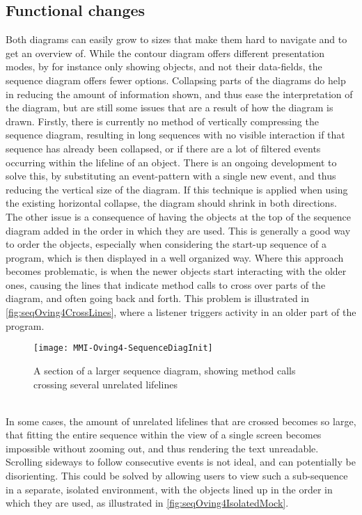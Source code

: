 \subsection{Functional changes}\label{jiveSuggestionsFunctional}
Both diagrams can easily grow to sizes that make them hard to navigate and to get an overview of.
While the contour diagram offers different presentation modes, by for instance only showing objects, and not their data-fields, the sequence diagram offers fewer options.
Collapsing parts of the diagrams do help in reducing the amount of information shown, and thus ease the interpretation of the diagram, but are still some issues that are a result of how the diagram is drawn.
Firstly, there is currently no method of vertically compressing the sequence diagram, resulting in long sequences with no visible interaction if that sequence has already been collapsed, or if there are a lot of filtered events occurring within the lifeline of an object.
There is an ongoing development to solve this, by substituting an event-pattern with a single new event, and thus reducing the vertical size of the diagram.
If this technique is applied when using the existing horizontal collapse, the diagram should shrink in both directions.
~\\

The other issue is a consequence of having the objects at the top of the sequence diagram added in the order in which they are used.
This is generally a good way to order the objects, especially when considering the start-up sequence of a program, which is then displayed in a well organized way.
Where this approach becomes problematic, is when the newer objects start interacting with the older ones, causing the lines that indicate method calls to cross over parts of the diagram, and often going back and forth.
This problem is illustrated in \autoref{fig:seqOving4CrossLines}, where a listener triggers activity in an older part of the program.
~\\

\begin{figure}[H]
	\centering
	\texttt{[image: MMI-Oving4-SequenceDiagInit]}
	\caption{A section of a larger sequence diagram, showing method calls crossing several unrelated lifelines}
	\label{fig:seqOving4CrossLines}
\end{figure}
~\\

In some cases, the amount of unrelated lifelines that are crossed becomes so large, that fitting the entire sequence within the view of a single screen becomes impossible without zooming out, and thus rendering the text unreadable.
Scrolling sideways to follow consecutive events is not ideal, and can potentially be disorienting.
This could be solved by allowing users to view such a sub-sequence in a separate, isolated environment, with the objects lined up in the order in which they are used, as illustrated in \autoref{fig:seqOving4IsolatedMock}.
~\\

